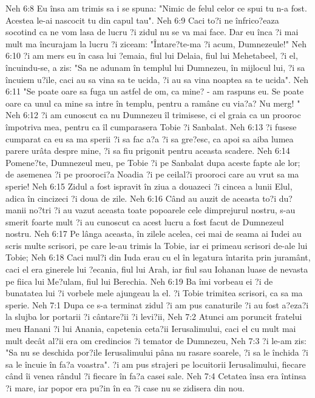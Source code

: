 Neh 6:8  Eu însa am trimis sa i se spuna: "Nimic de felul celor ce spui tu n-a fost. Acestea le-ai nascocit tu din capul tau".
Neh 6:9  Caci to?i ne înfrico?eaza socotind ca ne vom lasa de lucru ?i zidul nu se va mai face. Dar eu înca ?i mai mult ma încurajam la lucru ?i ziceam: "Întare?te-ma ?i acum, Dumnezeule!"
Neh 6:10  ?i am mers eu în casa lui ?emaia, fiul lui Delaia, fiul lui Mehetabeel, ?i el, încuindu-se, a zis: "Sa ne adunam în templul lui Dumnezeu, în mijlocul lui, ?i sa încuiem u?ile, caci au sa vina sa te ucida, ?i au sa vina noaptea sa te ucida".
Neh 6:11  "Se poate oare sa fuga un astfel de om, ca mine? - am raspuns eu. Se poate oare ca unul ca mine sa intre în templu, pentru a ramâne cu via?a? Nu merg! "
Neh 6:12  ?i am cunoscut ca nu Dumnezeu îl trimisese, ci el graia ca un prooroc împotriva mea, pentru ca îl cumparasera Tobie ?i Sanbalat.
Neh 6:13  ?i fusese cumparat ca eu sa ma sperii ?i sa fac a?a ?i sa gre?esc, ca apoi sa aiba lumea parere urâta despre mine, ?i sa fiu prigonit pentru aceasta scadere.
Neh 6:14  Pomene?te, Dumnezeul meu, pe Tobie ?i pe Sanbalat dupa aceste fapte ale lor; de asemenea ?i pe prooroci?a Noadia ?i pe ceilal?i prooroci care au vrut sa ma sperie!
Neh 6:15  Zidul a fost ispravit în ziua a douazeci ?i cincea a lunii Elul, adica în cincizeci ?i doua de zile.
Neh 6:16  Când au auzit de aceasta to?i du?manii no?tri ?i au vazut aceasta toate popoarele cele dimprejurul nostru, s-au smerit foarte mult ?i au cunoscut ca acest lucru a fost facut de Dumnezeul nostru.
Neh 6:17  Pe lânga aceasta, în zilele acelea, cei mai de seama ai Iudei au scris multe scrisori, pe care le-au trimis la Tobie, iar ei primeau scrisori de-ale lui Tobie;
Neh 6:18  Caci mul?i din Iuda erau cu el în legatura întarita prin juramânt, caci el era ginerele lui ?ecania, fiul lui Arah, iar fiul sau Iohanan luase de nevasta pe fiica lui Me?ulam, fiul lui Berechia.
Neh 6:19  Ba îmi vorbeau ei ?i de bunatatea lui ?i vorbele mele ajungeau la el. ?i Tobie trimitea scrisori, ca sa ma sperie.
Neh 7:1  Dupa ce s-a terminat zidul ?i am pus canaturile ?i au fost a?eza?i la slujba lor portarii ?i cântare?ii ?i levi?ii,
Neh 7:2  Atunci am poruncit fratelui meu Hanani ?i lui Anania, capetenia ceta?ii Ierusalimului, caci el cu mult mai mult decât al?ii era om credincios ?i temator de Dumnezeu,
Neh 7:3  ?i le-am zis: "Sa nu se deschida por?ile Ierusalimului pâna nu rasare soarele, ?i sa le închida ?i sa le încuie în fa?a voastra". ?i am pus strajeri pe locuitorii Ierusalimului, fiecare când îi venea rândul ?i fiecare în fa?a casei sale.
Neh 7:4  Cetatea însa era întinsa ?i mare, iar popor era pu?in în ea ?i case nu se zidisera din nou.
